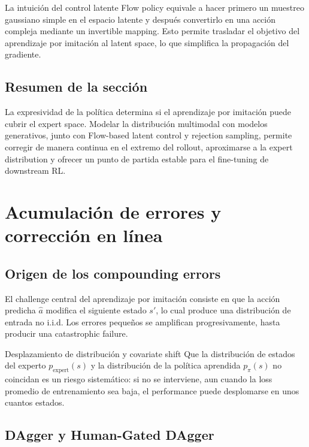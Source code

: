 \documentclass[a4paper]{article}
\begin{document}
\begin{importantbox}{La intuición del control latente}
Flow policy equivale a hacer primero un muestreo gaussiano simple en el espacio latente y después convertirlo en una acción compleja mediante un invertible mapping. Esto permite trasladar el objetivo del aprendizaje por imitación al latent space, lo que simplifica la propagación del gradiente.
\end{importantbox}

\subsection{Resumen de la sección}

La expresividad de la política determina si el aprendizaje por imitación puede cubrir el expert space. Modelar la distribución multimodal con modelos generativos, junto con Flow-based latent control y rejection sampling, permite corregir de manera continua en el extremo del rollout, aproximarse a la expert distribution y ofrecer un punto de partida estable para el fine-tuning de downstream RL.

\section{Acumulación de errores y corrección en línea}

\subsection{Origen de los compounding errors}

El challenge central del aprendizaje por imitación consiste en que la acción predicha $\hat{a}$ modifica el siguiente estado $s'$, lo cual produce una distribución de entrada no i.i.d. Los errores pequeños se amplifican progresivamente, hasta producir una catastrophic failure.

\begin{warningbox}{Desplazamiento de distribución y covariate shift}
Que la distribución de estados del experto $p_{\text{expert}}(s)$ y la distribución de la política aprendida $p_{\pi}(s)$ no coincidan es un riesgo sistemático: si no se interviene, aun cuando la loss promedio de entrenamiento sea baja, el performance puede desplomarse en unos cuantos estados.
\end{warningbox}

\subsection{DAgger y Human-Gated DAgger}
\end{document}
